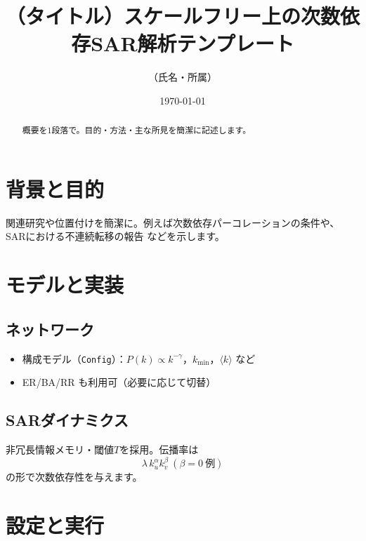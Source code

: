 \documentclass[uplatex,dvipdfmx,11pt]{bxjsarticle}
\title{（タイトル）スケールフリー上の次数依存SAR解析テンプレート}
\author{（氏名・所属）}
\date{\today}
\begin{document}
\maketitle

\begin{abstract}
概要を1段落で。目的・方法・主な所見を簡潔に記述します。
\end{abstract}

\section{背景と目的}
関連研究や位置付けを簡潔に。例えば次数依存パーコレーションの条件\cite{BaxterTimar2021}や、
SARにおける不連続転移の報告\cite{WangEtAl2015} などを示します。

\section{モデルと実装}
\subsection{ネットワーク}
\begin{itemize}[leftmargin=2em]
  \item 構成モデル（\texttt{Config}）：$P(k)\propto k^{-\gamma}$，$k_{\min}$，$\langle k\rangle$ など
  \item ER/BA/RR も利用可（必要に応じて切替）
\end{itemize}

\subsection{SARダイナミクス}
非冗長情報メモリ・閾値$T$を採用。伝播率は
\begin{equation}
\lambda\,k_u^{\alpha}k_v^{\beta}\ (\beta=0~\text{例})
\end{equation}
の形で次数依存性を与えます。

\section{設定と実行}
\end{document}
